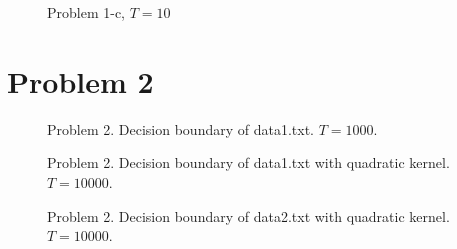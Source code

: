\documentclass[a4paper,11pt]{article}
\theoremstyle{mytheor}
\begin{document}
\begin{figure}[b]
	\caption{Problem 1-c, $T = 10$}
	\label{fig:1c}
\end{figure}

\section*{Problem 2}


\begin{figure}[b]
	\caption{Problem 2. Decision boundary of data1.txt. $T = 1000$.}
	\label{fig:2a-1}
\end{figure}

\begin{figure}[b]
	\caption{Problem 2. Decision boundary of data1.txt with quadratic kernel. $T = 10000$.}
	\label{fig:2a-1}
\end{figure}

\begin{figure}[b]
	\caption{Problem 2. Decision boundary of data2.txt with quadratic kernel. $T = 10000$.}
	\label{fig:2a-1}
\end{figure}
\end{document}
